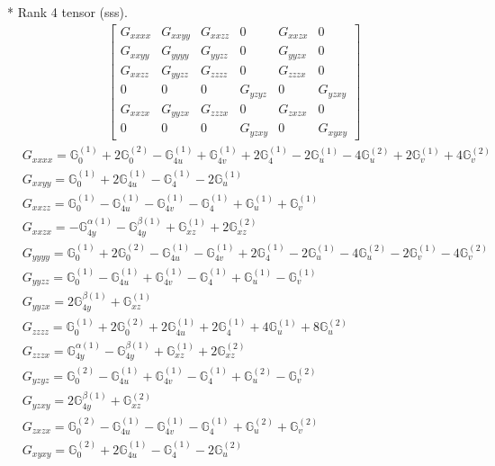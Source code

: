 \documentclass[fleqn,8pt,landscape]{jsarticle}
\begin{document}
* Rank 4 tensor (sss).
\begin{align*}
\begin{bmatrix} G_{xxxx} & G_{xxyy} & G_{xxzz} & 0 & G_{xxzx} & 0 \\ G_{xxyy} & G_{yyyy} & G_{yyzz} & 0 & G_{yyzx} & 0 \\ G_{xxzz} & G_{yyzz} & G_{zzzz} & 0 & G_{zzzx} & 0 \\ 0 & 0 & 0 & G_{yzyz} & 0 & G_{yzxy} \\ G_{xxzx} & G_{yyzx} & G_{zzzx} & 0 & G_{zxzx} & 0 \\ 0 & 0 & 0 & G_{yzxy} & 0 & G_{xyxy} \end{bmatrix}
\end{align*}
\begin{align*}
& G_{xxxx} = \mathbb{G}_{0}^{(1)} + 2 \mathbb{G}_{0}^{(2)} - \mathbb{G}_{4u}^{(1)} + \mathbb{G}_{4v}^{(1)} + 2 \mathbb{G}_{4}^{(1)} - 2 \mathbb{G}_{u}^{(1)} - 4 \mathbb{G}_{u}^{(2)} + 2 \mathbb{G}_{v}^{(1)} + 4 \mathbb{G}_{v}^{(2)} \\
& G_{xxyy} = \mathbb{G}_{0}^{(1)} + 2 \mathbb{G}_{4u}^{(1)} - \mathbb{G}_{4}^{(1)} - 2 \mathbb{G}_{u}^{(1)} \\
& G_{xxzz} = \mathbb{G}_{0}^{(1)} - \mathbb{G}_{4u}^{(1)} - \mathbb{G}_{4v}^{(1)} - \mathbb{G}_{4}^{(1)} + \mathbb{G}_{u}^{(1)} + \mathbb{G}_{v}^{(1)} \\
& G_{xxzx} = - \mathbb{G}_{4y}^{\alpha(1)} - \mathbb{G}_{4y}^{\beta(1)} + \mathbb{G}_{xz}^{(1)} + 2 \mathbb{G}_{xz}^{(2)} \\
& G_{yyyy} = \mathbb{G}_{0}^{(1)} + 2 \mathbb{G}_{0}^{(2)} - \mathbb{G}_{4u}^{(1)} - \mathbb{G}_{4v}^{(1)} + 2 \mathbb{G}_{4}^{(1)} - 2 \mathbb{G}_{u}^{(1)} - 4 \mathbb{G}_{u}^{(2)} - 2 \mathbb{G}_{v}^{(1)} - 4 \mathbb{G}_{v}^{(2)} \\
& G_{yyzz} = \mathbb{G}_{0}^{(1)} - \mathbb{G}_{4u}^{(1)} + \mathbb{G}_{4v}^{(1)} - \mathbb{G}_{4}^{(1)} + \mathbb{G}_{u}^{(1)} - \mathbb{G}_{v}^{(1)} \\
& G_{yyzx} = 2 \mathbb{G}_{4y}^{\beta(1)} + \mathbb{G}_{xz}^{(1)} \\
& G_{zzzz} = \mathbb{G}_{0}^{(1)} + 2 \mathbb{G}_{0}^{(2)} + 2 \mathbb{G}_{4u}^{(1)} + 2 \mathbb{G}_{4}^{(1)} + 4 \mathbb{G}_{u}^{(1)} + 8 \mathbb{G}_{u}^{(2)} \\
& G_{zzzx} = \mathbb{G}_{4y}^{\alpha(1)} - \mathbb{G}_{4y}^{\beta(1)} + \mathbb{G}_{xz}^{(1)} + 2 \mathbb{G}_{xz}^{(2)} \\
& G_{yzyz} = \mathbb{G}_{0}^{(2)} - \mathbb{G}_{4u}^{(1)} + \mathbb{G}_{4v}^{(1)} - \mathbb{G}_{4}^{(1)} + \mathbb{G}_{u}^{(2)} - \mathbb{G}_{v}^{(2)} \\
& G_{yzxy} = 2 \mathbb{G}_{4y}^{\beta(1)} + \mathbb{G}_{xz}^{(2)} \\
& G_{zxzx} = \mathbb{G}_{0}^{(2)} - \mathbb{G}_{4u}^{(1)} - \mathbb{G}_{4v}^{(1)} - \mathbb{G}_{4}^{(1)} + \mathbb{G}_{u}^{(2)} + \mathbb{G}_{v}^{(2)} \\
& G_{xyxy} = \mathbb{G}_{0}^{(2)} + 2 \mathbb{G}_{4u}^{(1)} - \mathbb{G}_{4}^{(1)} - 2 \mathbb{G}_{u}^{(2)}
\end{align*}
\end{document}
